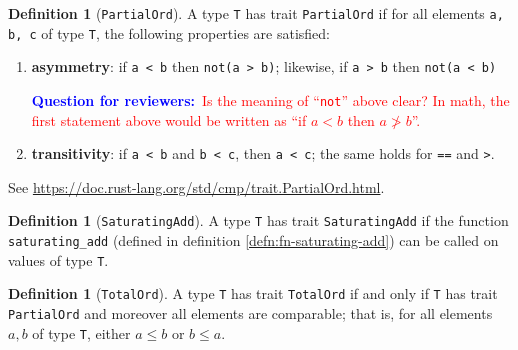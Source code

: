 \documentclass[11pt,a4paper]{article}
\theoremstyle{definition}
\newtheorem{definition}[theorem]{Definition}
\newcommand{\inRust}[2]{See \url{#2}.}
\newcommand{\questionr}[1]{\textcolor{blue}{\textbf{Question for reviewers:}}\textcolor{red}{~#1}}
\begin{document}
\begin{definition}[\texttt{PartialOrd}]\label{def:partial}
A type \texttt{T} has trait \texttt{PartialOrd} if for all elements \texttt{a, b, c} of type \texttt{T}, the following properties are satisfied:

    \begin{enumerate}
        \item \textbf{asymmetry}: if \texttt{a < b} then \texttt{not(a > b)}; likewise, if \texttt{a > b} then \texttt{not(a < b)}
        
        \questionr{Is the meaning of ``\texttt{not}'' above clear? In math, the first statement above would be written as ``if $a < b$ then $a \ngtr b$''.}
        
        \item \textbf{transitivity}: if \texttt{a < b} and \texttt{b < c}, then \texttt{a < c}; the same holds for \texttt{==} and \texttt{>}.
    \end{enumerate}

\inRust{Trait std::cmp::PartialOrd}{https://doc.rust-lang.org/std/cmp/trait.PartialOrd.html}
\end{definition}

\begin{definition}[\texttt{SaturatingAdd}]
    A type \texttt{T} has trait \texttt{SaturatingAdd} if the function \texttt{saturating\_add} (defined in definition \ref{defn:fn-saturating-add}) can be called on values of type \texttt{T}.
\end{definition}

\begin{definition}[\texttt{TotalOrd}]
\label{defn:trait-totalord}
    \label{defn:totalord}
    A type \texttt{T} has trait \texttt{TotalOrd} if and only if \texttt{T} has trait \texttt{PartialOrd} and moreover all elements are comparable; that is, for all elements $a, b$ of type \texttt{T}, either $a \leq b$ or $b \leq a$.
    
    
\end{definition}
\end{document}
